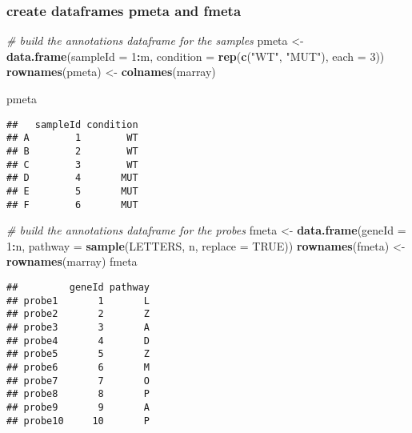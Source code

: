 \documentclass[]{article}
\newenvironment{Shaded}{\begin{snugshade}}{\end{snugshade}}
\newcommand{\CommentTok}[1]{\textcolor[rgb]{0.56,0.35,0.01}{\textit{#1}}}
\newcommand{\DataTypeTok}[1]{\textcolor[rgb]{0.13,0.29,0.53}{#1}}
\newcommand{\DecValTok}[1]{\textcolor[rgb]{0.00,0.00,0.81}{#1}}
\newcommand{\KeywordTok}[1]{\textcolor[rgb]{0.13,0.29,0.53}{\textbf{#1}}}
\newcommand{\NormalTok}[1]{#1}
\newcommand{\OperatorTok}[1]{\textcolor[rgb]{0.81,0.36,0.00}{\textbf{#1}}}
\newcommand{\OtherTok}[1]{\textcolor[rgb]{0.56,0.35,0.01}{#1}}
\newcommand{\StringTok}[1]{\textcolor[rgb]{0.31,0.60,0.02}{#1}}
\begin{document}
\hypertarget{create-dataframes-pmeta-and-fmeta}{%
\subsubsection{create dataframes pmeta and
fmeta}\label{create-dataframes-pmeta-and-fmeta}}

\begin{Shaded}
\begin{Highlighting}[]
\CommentTok{# build the annotations dataframe for the samples}
\NormalTok{pmeta <-}\StringTok{ }\KeywordTok{data.frame}\NormalTok{(}\DataTypeTok{sampleId =} \DecValTok{1}\OperatorTok{:}\NormalTok{m, }\DataTypeTok{condition =} \KeywordTok{rep}\NormalTok{(}\KeywordTok{c}\NormalTok{(}\StringTok{"WT"}\NormalTok{, }\StringTok{"MUT"}\NormalTok{), }\DataTypeTok{each =} \DecValTok{3}\NormalTok{))}
\KeywordTok{rownames}\NormalTok{(pmeta) <-}\StringTok{ }\KeywordTok{colnames}\NormalTok{(marray)}

\NormalTok{pmeta}
\end{Highlighting}
\end{Shaded}

\begin{verbatim}
##   sampleId condition
## A        1        WT
## B        2        WT
## C        3        WT
## D        4       MUT
## E        5       MUT
## F        6       MUT
\end{verbatim}

\begin{Shaded}
\begin{Highlighting}[]
\CommentTok{# build the annotations dataframe for the probes}
\NormalTok{fmeta <-}\StringTok{ }\KeywordTok{data.frame}\NormalTok{(}\DataTypeTok{geneId =} \DecValTok{1}\OperatorTok{:}\NormalTok{n, }\DataTypeTok{pathway =} \KeywordTok{sample}\NormalTok{(LETTERS, n, }\DataTypeTok{replace =} \OtherTok{TRUE}\NormalTok{))}
\KeywordTok{rownames}\NormalTok{(fmeta) <-}\StringTok{ }\KeywordTok{rownames}\NormalTok{(marray)}
\NormalTok{fmeta}
\end{Highlighting}
\end{Shaded}

\begin{verbatim}
##         geneId pathway
## probe1       1       L
## probe2       2       Z
## probe3       3       A
## probe4       4       D
## probe5       5       Z
## probe6       6       M
## probe7       7       O
## probe8       8       P
## probe9       9       A
## probe10     10       P
\end{verbatim}
\end{document}
